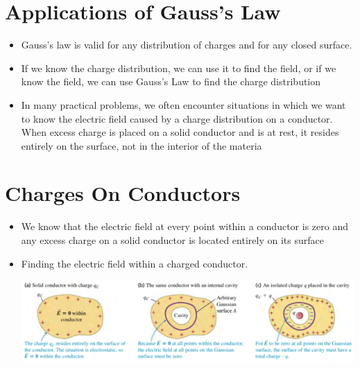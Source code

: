 \documentclass[11pt, a4paper]{article}
\begin{document}
\section[22.4, Applications of Gauss's Law]{Applications of Gauss's Law}
\begin{itemize}
    \item Gauss's law is valid for any distribution of charges and for any closed
        surface.
    \item If we know the charge distribution, we can use it to find the field, or if we
        know the field, we can use Gauss's Law to find the charge distribution
    \item In many practical problems, we often encounter situations in which we want to
        know the electric field caused by a charge distribution on a conductor. When
        excess charge is placed on a solid conductor and is at rest, it resides entirely
        on the surface, not in the interior of the materia
\end{itemize}

\section[22.5, Charges On Conductors]{Charges On Conductors}
\begin{itemize}
    \item We know that the electric field at every point within a conductor is zero
        and any excess charge on a solid conductor is located entirely on its surface
    \item Finding the electric field within a charged conductor.

\includegraphics[scale=0.65]{images/electric_fields.png}

\end{itemize}
\end{document}
